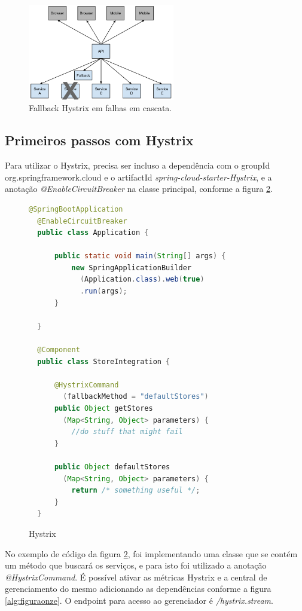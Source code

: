 \documentclass[journal]{IEEEtran}
\begin{document}
\begin{figure}[h]
\centering
\includegraphics[height=4.2cm]{figura7}
\caption{Fallback Hystrix em falhas em cascata.}
\label{fig:figura7}
\end{figure}

\subsection{Primeiros passos com Hystrix}

Para utilizar o Hystrix, precisa ser incluso a dependência com o groupId org.springframework.cloud e o artifactId \emph{spring-cloud-starter-Hystrix}, e a anotação \emph{@EnableCircuitBreaker} na classe principal, conforme a figura \ref{alg:figuradez}.

\begin{figure}[h]
\centering

\begin{lstlisting}[language=Java]
  @SpringBootApplication
  @EnableCircuitBreaker
  public class Application {

      public static void main(String[] args) {
          new SpringApplicationBuilder
            (Application.class).web(true)
            .run(args);
      }

  }

  @Component
  public class StoreIntegration {

      @HystrixCommand
        (fallbackMethod = "defaultStores")
      public Object getStores
        (Map<String, Object> parameters) {
          //do stuff that might fail
      }

      public Object defaultStores
        (Map<String, Object> parameters) {
          return /* something useful */;
      }
  }
\end{lstlisting}

\caption{Hystrix}
\label{alg:figuradez}
\end{figure}

No exemplo de código da figura \ref{alg:figuradez}, foi implementando uma classe que se contém um método que buscará os serviços, e para isto foi utilizado a anotação \emph{@HystrixCommand}. É possível ativar as métricas Hystrix e a central de gerenciamento do mesmo adicionando as dependências conforme a figura \ref{alg:figuraonze}. O endpoint para acesso ao gerenciador é \emph{/hystrix.stream}.
\end{document}
